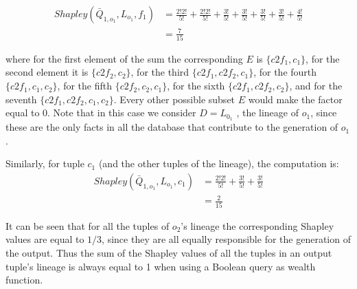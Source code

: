 \documentclass[preprint,12pt,sort&compress]{elsarticle}
\begin{document}
\[
\begin{array}{ll}
	Shapley(\bar{Q}_{1, o_1}, L_{o_1}, f_1) & = \frac{2!2!}{5!} + \frac{2!2!}{5!} + \frac{3!}{5!} + \frac{3!}{5!}  + \frac{3!}{5!} + \frac{3!}{5!} + \frac{4!}{5!}\\
	& = \frac{7}{15}
\end{array}
\]

\noindent
where for the first element of the sum the corresponding $E$ is $\{c2f_1, c_1\}$, for the second element it is $\{c2f_2, c_2\}$, for the third $\{c2f_1, c2f_2, c_1\}$, for the fourth  $\{c2f_1, c_1, c_2\}$, for the fifth  $\{c2f_2, c_2, c_1\}$, for the sixth  $\{c2f_1, c2f_2, c_2\}$, and for the seventh $\{c2f_1, c2f_2, c_1, c_2\}$. Every other possible subset $E$ would make the factor equal to $0$. Note that in this case we consider $D = L_{0_1}$ , the lineage of $o_1$, since these are the only facts in all the database that contribute to the generation of $o_1$.

Similarly, for tuple $c_1$ (and the other tuples of the lineage), the computation is:
\[
\begin{array}{ll}
	Shapley(\bar{Q}_{1, o_1}, L_{o_1}, c_1) & = \frac{2!2!}{5!} + \frac{3!}{5!} + \frac{3!}{5!}\\
	& = \frac{2}{15}
\end{array}
\]

It can be seen that for all the tuples of $o_2$'s lineage the corresponding Shapley values are equal to $1/3$, since they are all equally responsible for the generation of the output.
Thus the sum of the Shapley values of all the tuples in an output tuple's lineage is always equal to 1 when using a Boolean query as wealth function. 



\end{document}
